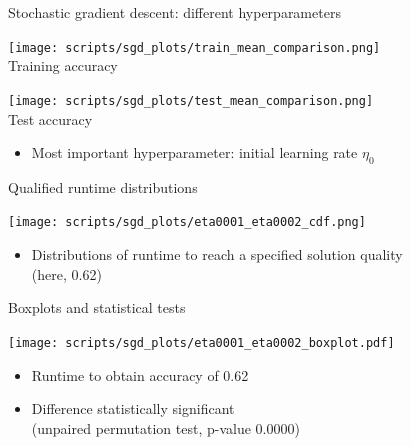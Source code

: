 \begin{frame}[c]{Stochastic gradient descent: different
hyperparameters}


\begin{multicols}{2}
\begin{center}
\texttt{[image: scripts/sgd\_plots/train\_mean\_comparison.png]}\\
Training accuracy
\end{center}
\columnbreak
\begin{center}
\texttt{[image: scripts/sgd\_plots/test\_mean\_comparison.png]}\\
Test accuracy
\end{center}
\end{multicols}

\begin{itemize}
  \item Most important hyperparameter: \alert{initial learning rate} $\eta_0$
\end{itemize}
  
\end{frame}

\begin{frame}[c]{Qualified runtime distributions}


\begin{center}
\texttt{[image: scripts/sgd\_plots/eta0001\_eta0002\_cdf.png]}\\
\end{center}

\begin{itemize}
  \item Distributions of runtime \alert{to reach a specified solution quality}\\
  (here, 0.62)
\end{itemize}
  
\end{frame}

\begin{frame}[c]{Boxplots and statistical tests}

\begin{center}
\texttt{[image: scripts/sgd\_plots/eta0001\_eta0002\_boxplot.pdf]}\\
\end{center}

\begin{itemize}
  \item Runtime to obtain accuracy of 0.62
  \item Difference statistically significant\\
  (unpaired permutation test, p-value 0.0000)
\end{itemize}
  
\end{frame}

